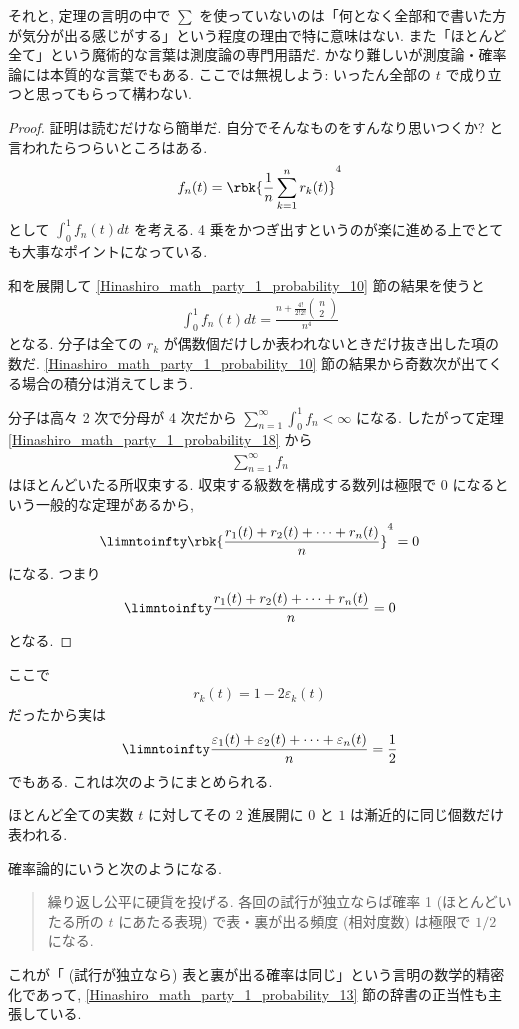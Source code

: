 \documentclass[openany, a4paper, oneside]{jsbook}
\begin{document}
それと, 定理の言明の中で $\sum$ を使っていないのは「何となく全部和で書いた方が気分が出る感じがする」という程度の理由で特に意味はない.
また「ほとんど全て」という魔術的な言葉は測度論の専門用語だ.
かなり難しいが測度論・確率論には本質的な言葉でもある.
ここでは無視しよう: いったん全部の $t$ で成り立つと思ってもらって構わない.
\begin{proof}
証明は読むだけなら簡単だ.
自分でそんなものをすんなり思いつくか? と言われたらつらいところはある.
\begin{align}
 f_n (t)
 =
 \rbk{\frac{1}{n} \sum_{k=1}^n r_k (t)}^4
\end{align}
として $\int_0^1 f_n (t) dt$ を考える.
4 乗をかつぎ出すというのが楽に進める上でとても大事なポイントになっている.

和を展開して \ref{Hinashiro_math_party_1_probability_10} 節の結果を使うと
\begin{align}
 \int_0^1 f_n (t) dt
 =
 \frac{n + \frac{4!}{2! 2!}
  \begin{pmatrix}
   n \\
   2
  \end{pmatrix}} {n^4}
\end{align}
となる.
分子は全ての $r_k$ が偶数個だけしか表われないときだけ抜き出した項の数だ.
\ref{Hinashiro_math_party_1_probability_10} 節の結果から奇数次が出てくる場合の積分は消えてしまう.

分子は高々 2 次で分母が 4 次だから $\sum_{n=1}^{\infty} \int_0^1 f_n < \infty$ になる.
したがって定理 \ref{Hinashiro_math_party_1_probability_18} から
\begin{align}
 \sum_{n=1}^{\infty} f_n
\end{align}
はほとんどいたる所収束する.
収束する級数を構成する数列は極限で 0 になるという一般的な定理があるから,
\begin{align}
 \limntoinfty  \rbk{\frac{r_1 (t) + r_2 (t) + \cdots + r_n (t)}{n}}^4 = 0
\end{align}
になる.
つまり
\begin{align}
 \limntoinfty \frac{r_1 (t) + r_2 (t) + \cdots + r_n (t)}{n} = 0
\end{align}
となる.
\end{proof}

ここで
\begin{align}
 r_k (t) = 1 - 2 \varepsilon_k (t)
\end{align}
だったから実は
\begin{align}
 \limntoinfty \frac{\varepsilon_1 (t) + \varepsilon_2 (t) + \cdots + \varepsilon_n (t)}{n} = \frac{1}{2}
\end{align}
でもある.
これは次のようにまとめられる.
\begin{thm}
 ほとんど全ての実数 $t$ に対してその $2$ 進展開に $0$ と $1$ は漸近的に同じ個数だけ表われる.
\end{thm}
確率論的にいうと次のようになる.
\begin{quote}
繰り返し公平に硬貨を投げる.
各回の試行が独立ならば確率 1 (ほとんどいたる所の $t$ にあたる表現) で表・裏が出る頻度 (相対度数) は極限で $1/2$ になる.
\end{quote}
これが「 (試行が独立なら) 表と裏が出る確率は同じ」という言明の数学的精密化であって,
\ref{Hinashiro_math_party_1_probability_13} 節の辞書の正当性も主張している.
\end{document}
